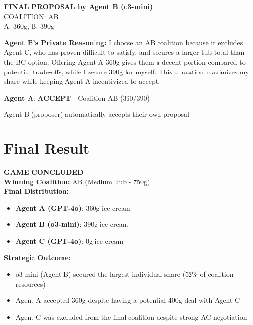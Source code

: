 \documentclass[11pt,a4paper]{article}
\newcommand{\agentname}[2]{\textbf{\textcolor{#1}{#2}}}
\begin{document}
\begin{trademsg}
\textbf{FINAL PROPOSAL by \agentname{agentB}{Agent B (o3-mini)}}\\
COALITION: AB\\
A: 360g, B: 390g
\end{trademsg}

\begin{reasoningbox}
\textbf{Agent B's Private Reasoning:} I choose an AB coalition because it excludes Agent C, who has proven difficult to satisfy, and secures a larger tub total than the BC option. Offering Agent A 360g gives them a decent portion compared to potential trade-offs, while I secure 390g for myself. This allocation maximizes my share while keeping Agent A incentivized to accept.
\end{reasoningbox}

\begin{agentAmsg}
\agentname{agentA}{Agent A}: \textbf{ACCEPT} - Coalition AB (360/390)
\end{agentAmsg}

\begin{systemmsg}
Agent B (proposer) automatically accepts their own proposal.
\end{systemmsg}

\section{Final Result}

\begin{trademsg}
\textbf{GAME CONCLUDED}\\

\textbf{Winning Coalition:} AB (Medium Tub - 750g)\\

\textbf{Final Distribution:}
\begin{itemize}[itemsep=2pt]
    \item \agentname{agentA}{Agent A (GPT-4o)}: 360g ice cream
    \item \agentname{agentB}{Agent B (o3-mini)}: 390g ice cream  
    \item \agentname{agentC}{Agent C (GPT-4o)}: 0g ice cream
\end{itemize}

\textbf{Strategic Outcome:}
\begin{itemize}[itemsep=2pt]
    \item o3-mini (Agent B) secured the largest individual share (52\% of coalition resources)
    \item Agent A accepted 360g despite having a potential 400g deal with Agent C
    \item Agent C was excluded from the final coalition despite strong AC negotiation
\end{itemize}
\end{trademsg}
\end{document}
